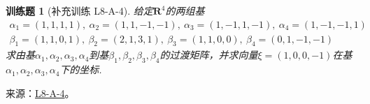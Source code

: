 \documentclass[UTF8,12pt,a4paper,fontset=fandol]{ctexart}
\newtheorem{exercise}{训练题}[section]
\begin{document}
\begin{exercise}[补充训练 L8-A-4]\label{prob:L8-A-4}
给定$\mathbf{R}^4$的两组基
        \begin{gather*}
            \alpha_1=(1,1,1,1),\ \alpha_2=(1,1,-1,-1),\ \alpha_3=(1,-1,1,-1),\ \alpha_4=(1,-1,-1,1) \\
            \beta_1=(1,1,0,1),\ \beta_2=(2,1,3,1),\ \beta_3=(1,1,0,0),\ \beta_4=(0,1,-1,-1)
        \end{gather*}
        求由基$\alpha_1,\alpha_2,\alpha_3,\alpha_4$到基$\beta_1,\beta_2,\beta_3,\beta_4$的过渡矩阵，并求向量$\xi=(1,0,0,-1)$在基$\alpha_1,\alpha_2,\alpha_3,\alpha_4$下的坐标.
\end{exercise}
\noindent 来源：\href{https://github.com/yhwu-is/Linear-Algebra-Left-Undone/blob/new/%E8%AE%B2%E4%B9%89/%E4%B8%93%E9%A2%98/8%20%E7%9B%B8%E6%8A%B5%E6%A0%87%E5%87%86%E5%BD%A2.tex}{L8-A-4}。
\end{document}

